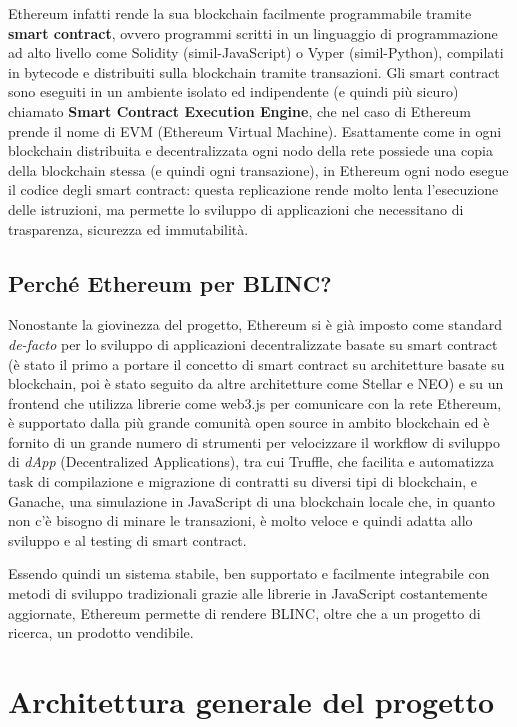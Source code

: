 Ethereum infatti rende la sua blockchain facilmente programmabile tramite \textbf{smart contract}, ovvero programmi scritti
in un linguaggio di programmazione ad alto livello come Solidity (simil-JavaScript) o Vyper (simil-Python),
compilati in bytecode e distribuiti sulla blockchain tramite transazioni. 
Gli smart contract sono eseguiti in un ambiente isolato ed indipendente (e quindi più sicuro)
chiamato \textbf{Smart Contract Execution Engine}, che nel caso di Ethereum prende il nome di EVM (Ethereum Virtual Machine).
Esattamente come in ogni blockchain distribuita e decentralizzata ogni nodo della rete possiede una copia della blockchain stessa
(e quindi ogni transazione), in Ethereum ogni nodo esegue il codice degli smart contract: questa replicazione rende molto lenta
l’esecuzione delle istruzioni, ma permette lo sviluppo di applicazioni che necessitano di trasparenza, sicurezza ed immutabilità.

\subsection{Perché Ethereum per BLINC?}
Nonostante la giovinezza del progetto, Ethereum si è già imposto come standard \emph{de-facto}
per lo sviluppo di applicazioni decentralizzate basate su smart contract
(è stato il primo a portare il concetto di smart contract su architetture
basate su blockchain, poi è stato seguito da altre architetture come Stellar e NEO)
e su un frontend che utilizza librerie come web3.js per comunicare con la rete Ethereum,
è supportato dalla più grande comunità open source in ambito blockchain ed è fornito di un grande numero
di strumenti per velocizzare il workflow di sviluppo di \emph{dApp} (Decentralized Applications), tra cui
Truffle, che facilita e automatizza task di compilazione e migrazione di contratti su diversi tipi di blockchain,
e Ganache, una simulazione in JavaScript di una blockchain locale che, in quanto non c'è bisogno di minare le
transazioni, è molto veloce e quindi adatta allo sviluppo e al testing di smart contract.

Essendo quindi un sistema stabile, ben supportato e facilmente integrabile con metodi di sviluppo tradizionali
grazie alle librerie in JavaScript costantemente aggiornate, Ethereum permette di rendere BLINC,
oltre che a un progetto di ricerca, un prodotto vendibile.

\section{Architettura generale del progetto}

